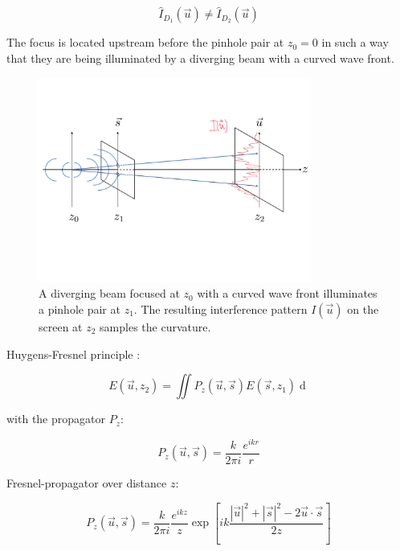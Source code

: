 \documentclass{osa-article}
\begin{document}
\begin{equation}
    \hat{I}_{D_1}(\vec{u}) \neq \hat{I}_{D_2}(\vec{u})
\end{equation}

The focus is located upstream before the pinhole pair at $z_0=0$ in such a way that they are being illuminated by a diverging beam with a curved wave front.

\begin{figure}[h!]
    \centering
    \includegraphics[trim={0cm 0cm 0cm 0cm}, width=0.8\textwidth]{gfx/propagationsketch.pdf}
    \caption{A diverging beam focused at $z_0$ with a curved wave front illuminates a pinhole pair at $z_1$. The resulting interference pattern $I(\vec{u})$ on the screen at $z_2$ samples the curvature.}
    \label{fig:propagationsketch}
\end{figure}

Huygens-Fresnel principle \cite{BornWolfBhatia2002-PrinciplesOptics}:

\begin{equation}
    E(\vec{u},z_2) = \iint P_z(\vec{u},\vec{s}) E(\vec{s},z_1)  \mathop{d\vec{s}}
\end{equation}

with the propagator $P_z$:

\begin{equation}
    P_z(\vec{u},\vec{s}) = \frac{k}{2 \pi i} \frac{e^{ikr}}{r}
\end{equation}



Fresnel-propagator over distance $z$:

\begin{equation}
    P_z(\vec{u},\vec{s}) = \frac{k}{2 \pi i} \frac{e^{ikz}}{z} \exp{\left[ik \frac{\left|\vec{u}\right|^2 + \left|\vec{s}\right|^2 - 2 \vec{u}\cdot\vec{s}}{2z}\right]}
    \label{eq:fresnel-propagator}
\end{equation}
\end{document}
